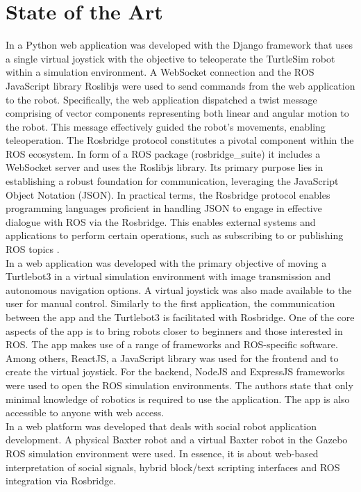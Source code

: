 \documentclass[conference]{IEEEtran}
\begin{document}
\section{State of the Art}
In \cite{kapic} a Python web application was developed with the Django framework that uses a single virtual joystick with the objective to teleoperate the TurtleSim robot within a simulation environment. 
A WebSocket connection and the ROS JavaScript library Roslibjs were used to send commands from the web application to the robot. Specifically, the web application dispatched a twist message comprising of vector components representing both linear and angular motion to the robot. This message effectively guided the robot's movements, enabling teleoperation.
The Rosbridge protocol constitutes a pivotal component within the ROS ecosystem. In form of a ROS package (rosbridge\_suite) it includes a WebSocket server and uses the Roslibjs library. Its primary purpose lies in establishing a robust foundation for communication, leveraging the JavaScript Object Notation (JSON).
In practical terms, the Rosbridge protocol enables programming languages proficient in handling JSON to engage in effective dialogue with ROS via the Rosbridge. 
This enables external systems and applications to perform certain operations, such as subscribing to or publishing ROS topics \cite{rosbridgeOkState} \cite{rosbridgeSuite}.\\
In \cite{dinodi} a web application was developed with the primary objective of moving a Turtlebot3 in a virtual simulation environment with image transmission and autonomous navigation options. A virtual joystick was also made available to the user for manual control. Similarly to the first application, the communication between the app and the Turtlebot3 is facilitated with Rosbridge. 
One of the core aspects of the app is to bring robots closer to beginners and those interested in ROS. 
The app makes use of a range of frameworks and ROS-specific software. Among others, ReactJS, a JavaScript library was used for the frontend and to create the virtual joystick. For the backend, NodeJS and ExpressJS frameworks were used to open the ROS simulation environments. 
The authors state that only minimal knowledge of robotics is required to use the application. The app is also accessible to anyone with web access.\\
In \cite{johnson} a web platform was developed that deals with social robot application development. A physical Baxter robot and a virtual Baxter robot in the Gazebo ROS simulation environment were used. In essence, it is about web-based interpretation of social signals, hybrid block/text scripting interfaces and ROS integration via Rosbridge. 
\end{document}
